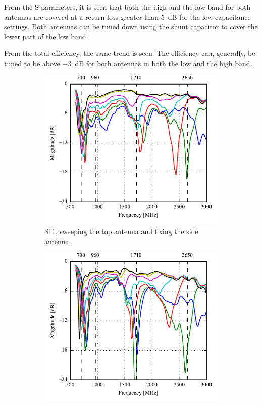 From the S-parameters, it is seen that both the high and the low band for both antennas are covered at a return loss greater than \SI{5}{dB} for the low capacitance settings. Both antennas can be tuned down using the shunt capacitor to cover the lower part of the low band.

From the total efficiency, the same trend is seen. The efficiency can, generally, be tuned to be above \SI{-3}{dB} for both antennas in both the low and the high band.

\begin{figure}[htbp]
    \centering
    \begin{subfigure}{0.49\linewidth}
        \includegraphics{img/tech_sol/trianglefeed/mockup/sweep_s11_csh1.pdf}
        \caption{S11, sweeping the top antenna and fixing the side antenna.}
    \end{subfigure}
    \hfill
    \begin{subfigure}{0.49\linewidth}
        \includegraphics{img/tech_sol/trianglefeed/mockup/sweep_s22_csh2.pdf}

\end{subfigure}
\end{figure}
